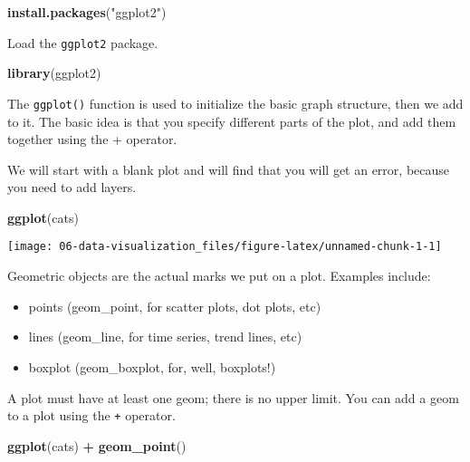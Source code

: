 \documentclass[11pt,]{article}
\newenvironment{Shaded}{\begin{snugshade}}{\end{snugshade}}
\newcommand{\KeywordTok}[1]{\textcolor[rgb]{0.13,0.29,0.53}{\textbf{#1}}}
\newcommand{\NormalTok}[1]{#1}
\newcommand{\OperatorTok}[1]{\textcolor[rgb]{0.81,0.36,0.00}{\textbf{#1}}}
\newcommand{\StringTok}[1]{\textcolor[rgb]{0.31,0.60,0.02}{#1}}
\providecommand{\tightlist}{%
  \setlength{\itemsep}{0pt}\setlength{\parskip}{0pt}}
\begin{document}
\begin{Shaded}
\begin{Highlighting}[]
\KeywordTok{install.packages}\NormalTok{(}\StringTok{"ggplot2"}\NormalTok{)}
\end{Highlighting}
\end{Shaded}

Load the \texttt{ggplot2} package.

\begin{Shaded}
\begin{Highlighting}[]
\KeywordTok{library}\NormalTok{(ggplot2)}
\end{Highlighting}
\end{Shaded}

The \texttt{ggplot()} function is used to initialize the basic graph
structure, then we add to it. The basic idea is that you specify
different parts of the plot, and add them together using the + operator.

We will start with a blank plot and will find that you will get an
error, because you need to add layers.

\begin{Shaded}
\begin{Highlighting}[]
\KeywordTok{ggplot}\NormalTok{(cats)}
\end{Highlighting}
\end{Shaded}

\begin{center}\texttt{[image: 06-data-visualization\_files/figure-latex/unnamed-chunk-1-1]} \end{center}

Geometric objects are the actual marks we put on a plot. Examples
include:

\begin{itemize}
\tightlist
\item
  points (geom\_point, for scatter plots, dot plots, etc)
\item
  lines (geom\_line, for time series, trend lines, etc)
\item
  boxplot (geom\_boxplot, for, well, boxplots!)
\end{itemize}

A plot must have at least one geom; there is no upper limit. You can add
a geom to a plot using the \texttt{+} operator.

\begin{Shaded}
\begin{Highlighting}[]
\KeywordTok{ggplot}\NormalTok{(cats) }\OperatorTok{+}
\StringTok{    }\KeywordTok{geom_point}\NormalTok{()}
\end{Highlighting}
\end{Shaded}
\end{document}

